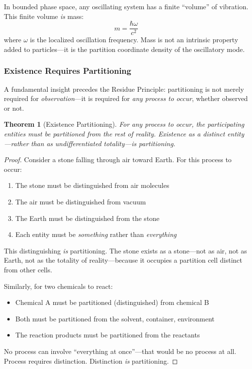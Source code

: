 \documentclass[twocolumn,10pt,a4paper]{article}
\newtheorem{theorem}{Theorem}[section]
\theoremstyle{definition}
\theoremstyle{remark}
\begin{document}
In bounded phase space, any oscillating system has a finite ``volume'' of vibration. This finite volume \emph{is} mass:
\begin{equation}
    m = \frac{\hbar \omega}{c^2}
\end{equation}
where $\omega$ is the localized oscillation frequency. Mass is not an intrinsic property added to particles---it is the partition coordinate density of the oscillatory mode.

\subsubsection{Existence Requires Partitioning}

A fundamental insight precedes the Residue Principle: partitioning is not merely required for \emph{observation}---it is required for \emph{any process to occur}, whether observed or not.

\begin{theorem}[Existence Partitioning]
\label{thm:existence_partition}
For any process to occur, the participating entities must be partitioned from the rest of reality. Existence as a distinct entity---rather than as undifferentiated totality---\emph{is} partitioning.
\end{theorem}

\begin{proof}
Consider a stone falling through air toward Earth. For this process to occur:
\begin{enumerate}
    \item The stone must be distinguished from air molecules
    \item The air must be distinguished from vacuum
    \item The Earth must be distinguished from the stone
    \item Each entity must be \emph{something} rather than \emph{everything}
\end{enumerate}

This distinguishing \emph{is} partitioning. The stone exists as a stone---not as air, not as Earth, not as the totality of reality---because it occupies a partition cell distinct from other cells.

Similarly, for two chemicals to react:
\begin{itemize}
    \item Chemical A must be partitioned (distinguished) from chemical B
    \item Both must be partitioned from the solvent, container, environment
    \item The reaction products must be partitioned from the reactants
\end{itemize}

No process can involve ``everything at once''---that would be no process at all. Process requires distinction. Distinction \emph{is} partitioning.
\end{proof}
\end{document}
